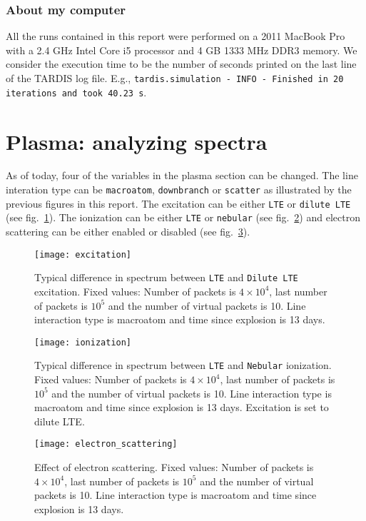 \documentclass[letterpaper,12pt]{article}
\begin{document}
\subsubsection{\label{sec:my_compyter} About my computer}
All the runs contained in this report were performed on a 2011 MacBook Pro with a 2.4 GHz Intel Core i5 processor and 4 GB 1333 MHz DDR3 memory. We consider the execution time to be the number of seconds printed on the last line of the TARDIS log file. E.g., \texttt{tardis.simulation - INFO - Finished in 20 iterations and took 40.23 s}.


\section{\label{sec:plasma_spectra}Plasma: analyzing spectra}
As of today, four of the variables in the plasma section can be changed. The line interation type can be \texttt{macroatom}, \texttt{downbranch} or \texttt{scatter} as illustrated by the previous figures in this report. The excitation can be either \texttt{LTE} or \texttt{dilute LTE} (see fig.~\ref{fig:excitation}). The ionization can be either \texttt{LTE} or \texttt{nebular} (see fig.~\ref{fig:ionization}) and electron scattering can be either enabled or disabled (see fig.~\ref{fig:scattering}).  

\begin{figure}[htpb]
  \centering
  \texttt{[image: excitation]}
  \caption{
    \label{fig:excitation}
    Typical difference in spectrum between \texttt{LTE} and \texttt{Dilute LTE} excitation. Fixed values: Number of packets is $4 \times 10^4$, last number of packets is $10^5$ and the number of virtual packets is 10. Line interaction type is macroatom and time since explosion is 13 days.
} 

\end{figure}

\begin{figure}[htpb]
  \centering
  \texttt{[image: ionization]}
  \caption{
    \label{fig:ionization}
    Typical difference in spectrum between \texttt{LTE} and \texttt{Nebular} ionization. Fixed values: Number of packets is $4 \times 10^4$, last number of packets is $10^5$ and the number of virtual packets is 10. Line interaction type is macroatom and time since explosion is 13 days. Excitation is set to dilute LTE.
}
\end{figure} 

\begin{figure}[htpb]
  \centering
  \texttt{[image: electron\_scattering]}
  \caption{
    \label{fig:scattering}
    Effect of electron scattering. Fixed values: Number of packets is $4 \times 10^4$, last number of packets is $10^5$ and the number of virtual packets is 10. Line interaction type is macroatom and time since explosion is 13 days.
}
\end{figure}  
\end{document}
